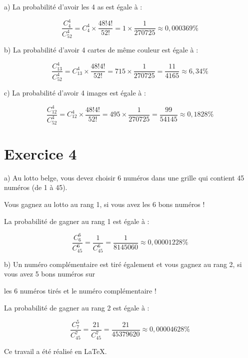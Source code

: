\documentclass[10pt]{article}
\begin{document}
a) La probabilité d'avoir les 4 as est égale à :

$$\frac{C_4^4}{C_{52}^4}=C_4^4\times\frac{48!4!}{52!}=1\times \frac{1}{270725}\approx 0,000369\%$$

b) La probabilité d'avoir 4 cartes de même couleur est égale à :

$$\frac{C_{13}^4}{C_{52}^4}=C_{13}^4\times\frac{48!4!}{52!}=715\times\frac{1}{270725}=\frac{11}{4165}\approx6,34\%$$

c) La probabilité d'avoir 4 images est égale à :

$$\frac{C_{12}^4}{C_{52}^4}=C_{12}^4\times\frac{48!4!}{52!}=495\times\frac{1}{270725}=\frac{99}{54145}\approx0,1828\%$$

\newpage

\section*{Exercice 4}

\hspace{16pt}a) Au lotto belge, vous devez choisir 6 numéros dans une grille qui contient 45 numéros (de 1 à 45). 

Vous gagnez au lotto au rang 1, si vous avez les 6 bons numéros !

La probabilité de gagner au rang 1 est égale à :

$$\frac{C_6^6}{C_{45}^6}=\frac{1}{C_{45}^6}=\frac{1}{8145060}\approx0,00001228\%$$

b) Un numéro complémentaire est tiré également et vous gagnez au rang 2, si vous avez 5 bons numéros sur 

les 6 numéros tirés et le numéro complémentaire !

La probabilité de gagner au rang 2 est égale à :

$$\frac{C_7^5}{C_{45}^7}=\frac{21}{C_{45}^7}=\frac{21}{45379620}\approx0,00004628\%$$
\vspace{18cm}
\begin{center}
\vspace{1cm}Ce travail a été réalisé en \LaTeX . \vspace{0.2cm}
\end{center}
\end{document}
